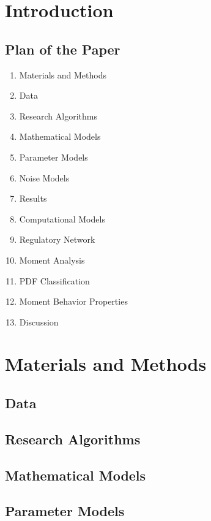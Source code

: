 



\section{Introduction}

\subsection{Plan of the Paper}

\begin{enumerate}
	\item Materials and Methods
	\item Data
	\item Research Algorithms
	\item Mathematical Models
	\item Parameter Models
	\item Noise Models
	\item Results
	\item Computational Models
	\item Regulatory Network
	\item Moment Analysis
	\item PDF Classification
	\item Moment Behavior Properties
	\item Discussion
\end{enumerate}

\section{Materials and Methods}

\subsection{Data}

\subsection{Research Algorithms}

\subsection{Mathematical Models}

\subsection{Parameter Models}

